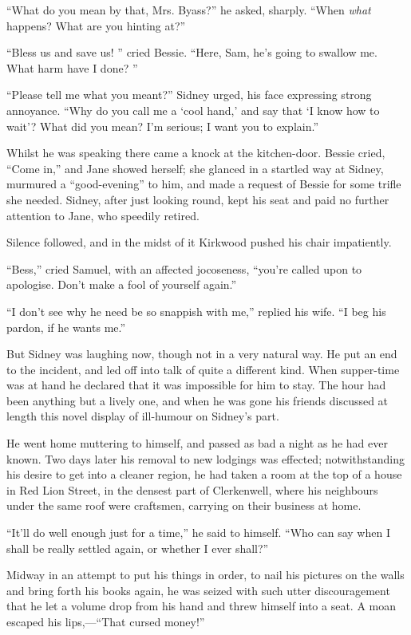 ``What do you mean by that, Mrs. Byass?'' he asked, sharply. ``When
\emph{what} happens? What are you hinting at?''

``Bless us and save us! '' cried Bessie. ``Here, Sam, he's going to
swallow me. What harm have I done? ''

``Please tell me what you meant?'' Sidney urged, his face expressing
strong annoyance. ``Why do you call me a `cool hand,' and say that `I
know how to wait'? What did you mean? I'm serious; I want you to
explain.''

Whilst he was speaking there came a knock at the kitchen-door. Bessie
cried, ``Come in,'' and Jane showed herself; she {}glanced in a startled
way at Sidney, murmured a ``good-evening'' to him, and made a request of
Bessie for some trifle she needed. Sidney, after just looking round,
kept his seat and paid no further attention to Jane, who speedily
retired.

Silence followed, and in the midst of it Kirkwood pushed his chair
impatiently.

``Bess,'' cried Samuel, with an affected jocoseness, ``you're called
upon to apologise. Don't make a fool of yourself again.''

``I don't see why he need be so snappish with me,'' replied his wife.
``I beg his pardon, if he wants me.''

But Sidney was laughing now, though not in a very natural way. He put an
end to the incident, and led off into talk of quite a different kind.
When supper-time was at hand he declared that it was impossible for him
to stay. The hour had been anything but a lively one, and when he was
gone his friends discussed at length this novel display of ill-humour on
Sidney's part.

He went home muttering to himself, and {}passed as bad a night as he had
ever known. Two days later his removal to new lodgings was effected;
notwithstanding his desire to get into a cleaner region, he had taken a
room at the top of a house in Red Lion Street, in the densest part of
Clerkenwell, where his neighbours under the same roof were craftsmen,
carrying on their business at home.

``It'll do well enough just for a time,'' he said to himself. ``Who can
say when I shall be really settled again, or whether I ever shall?''

Midway in an attempt to put his things in order, to nail his pictures on
the walls and bring forth his books again, he was seized with such utter
discouragement that he let a volume drop from his hand and threw himself
into a seat. A moan escaped his lips,---``That cursed money!''

